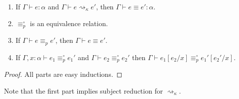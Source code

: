 \begin{lemma}
\begin{enumerate}
\item If $\Gamma\vdash e:\alpha$ and $\Gamma\vdash e\rightsquigarrow_\kappa e'$, then $\Gamma\vdash e\equiv e':\alpha$.
\item $\equiv_p^\circ$ is an equivalence relation.
\item If $\Gamma\vdash e\equiv_p e'$, then $\Gamma\vdash e\equiv e'$.
\item\label{p_subst} If $\Gamma,x:\alpha\vdash e_1\equiv_p^\circ e_1'$ and $\Gamma\vdash e_2\equiv_p^\circ e_2'$ then $\Gamma\vdash e_1[e_2/x]\equiv_p^\circ e_1'[e_2'/x]$.
\end{enumerate}
\end{lemma}
\begin{proof}
All parts are easy inductions.
\end{proof}
Note that the first part implies subject reduction for $\rightsquigarrow_\kappa$.

